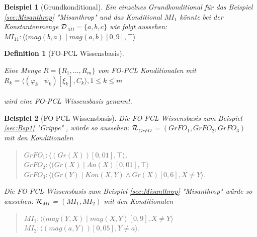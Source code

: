 \documentclass[a4paper, 11pt]{book}
\newtheorem{Def}{Definition }[section]
\newtheorem{Bsp}{Beispiel}[section]
\begin{document}
\begin{Bsp}[Grundkonditional]
	Ein einzelnes Grundkonditional für das Beispiel \ref{sec:Misanthrop} "{}Misanthrop"{} und das Konditional $ MI_1 $ könnte bei der Konstantenmenge $ \cal{D} $$_{MI} = \{ a, b, c\} $ wie folgt aussehen:\\
	$ MI_{11} : \langle (mag(b, a) \mid mag(a, b
	)[0,9], \top \rangle $\\
	
\end{Bsp}

\begin{Def}[FO-PCL Wissensbasis]\cite[S. 6]{Fis12}  \label{KB}

\noindent
Eine Menge $ R = \{R_1, ..., R_m\} $ von FO-PCL Konditionalen mit\\

 $ R_k =  \langle(\varphi_k \mid \psi_k)[\xi_k], C_k \rangle , 1 \leq k \leq m $ \\
\\wird eine FO-PCL Wissensbasis genannt.
\end{Def}

\begin{Bsp}[FO-PCL Wissensbasis]
Die FO-PCL Wissensbasis zum Beispiel \ref{sec:Bsp1} "{}Grippe"{} ,
würde so aussehen: $ \cal{R} $$_{GrFO}  $ = $ (GrFO_1, GrFO_2, GrFO_3)  $ mit den Konditionalen 
\begin{quote}
$ GrFO_{1}  :  \langle (Gr(X))[0,01], \top \rangle $,\\
$ GrFO_{2} : \langle (Gr(X) \mid An(X)[0,01], \top \rangle$\\
$ GrFO_{3} : \langle (Gr(Y) \mid Kon(X, Y) \wedge Gr(X )[0,6], X \neq Y \rangle$.\\
\end{quote}
Die FO-PCL Wissensbasis zum Beispiel \ref{sec:Misanthrop} "{}Misanthrop"{} würde so aussehen: $ \cal{R} $$_{MI}  $ = $ (MI_1, MI_2)  $  mit den Konditionalen 
\begin{quote}
	$ MI_1 : \langle (mag(Y, X) \mid mag(X, Y)[0,9], X \neq Y \rangle$\\
	$ MI_2 : \langle (mag(a, Y))[0,05], Y \neq a \rangle$.\\
\end{quote}
 	
\end{Bsp}
\end{document}
